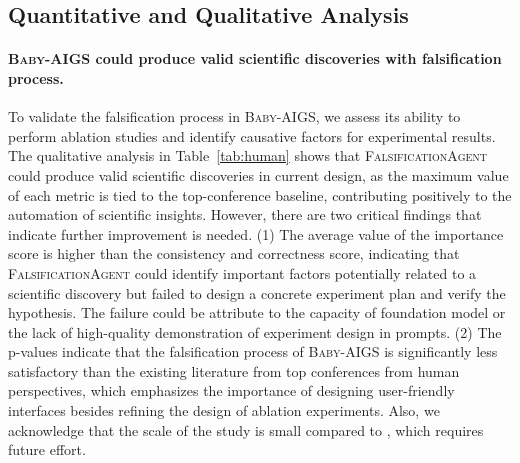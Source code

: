 \documentclass{article} %
\newcommand{\AIGSSys}{\textsc{Baby-AIGS}\xspace}
\newcommand{\FalsificationAgent}{\textsc{FalsificationAgent}\xspace}
\begin{document}
\subsection{Quantitative and Qualitative Analysis}\label{sec:exp-result}



\paragraph{\AIGSSys could produce valid scientific discoveries with falsification process.}

To validate the falsification process in \AIGSSys, we assess its ability to perform ablation studies and identify causative factors for experimental results. The qualitative analysis in Table~\ref{tab:human} shows that \FalsificationAgent could produce valid scientific discoveries in current design, as the maximum value of each metric is tied to the top-conference baseline, contributing positively to the automation of scientific insights. However, there are two critical findings that indicate further improvement is needed. (1) The average value of the importance score is higher than the consistency and correctness score, indicating that \FalsificationAgent could identify important factors potentially related to a scientific discovery but failed to design a concrete experiment plan and verify the hypothesis. The failure could be attribute to the capacity of foundation model or the lack of high-quality demonstration of experiment design in prompts. (2) The p-values indicate that the falsification process of \AIGSSys is significantly less satisfactory than the existing literature from top conferences from human perspectives, which emphasizes the importance of designing user-friendly interfaces besides refining the design of ablation experiments. Also, we acknowledge that the scale of the study is small compared to \citet{si2024can}, which requires future effort. 
\end{document}
